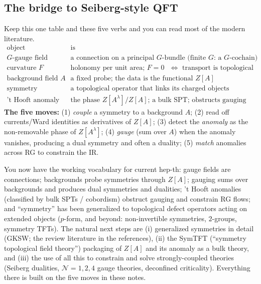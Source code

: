 \documentclass[11pt]{article}
\begin{document}
\subsection{The bridge to Seiberg-style QFT}

\begin{eequation}
Keep this one table and these five verbs and you can read most of the modern literature.
\[
\begin{array}{l|l}
\text{object} & \text{is} \\\hline
\text{$G$-gauge field} & \text{a connection on a principal $G$-bundle (finite $G$: a }G\text{-cochain)}\\
\text{curvature }F & \text{holonomy per unit area; }F=0\text{ }\Leftrightarrow\text{ transport is topological}\\
\text{background field }A & \text{a fixed probe; the data is the functional }Z[A]\\
\text{symmetry} & \text{a topological operator that links its charged objects}\\
\text{'t Hooft anomaly} & \text{the phase }Z[A^\lambda]/Z[A]\text{; a bulk SPT; obstructs gauging}
\end{array}
\]
\textbf{The five moves:} \;(1) \emph{couple} a symmetry to a background $A$;
\;(2) read off currents/Ward identities as derivatives of $Z[A]$;
\;(3) detect the \emph{anomaly} as the non-removable phase of $Z[A^\lambda]$;
\;(4) \emph{gauge} (sum over $A$) when the anomaly vanishes, producing a dual symmetry
and often a duality;
\;(5) \emph{match} anomalies across RG to constrain the IR.
\end{eequation}

\begin{ppreview}
You now have the working vocabulary for current hep-th: gauge fields are connections;
backgrounds probe symmetries through $Z[A]$; gauging sums over backgrounds and produces
dual symmetries and dualities; 't Hooft anomalies (classified by bulk SPTs / cobordism)
obstruct gauging and constrain RG flows; and ``symmetry'' has been generalized to
topological defect operators acting on extended objects ($p$-form, and beyond:
non-invertible symmetries, $2$-groups, symmetry TFTs). The natural next steps are
(i) generalized symmetries in detail (GKSW; the review literature in the references),
(ii) the SymTFT (``symmetry topological field theory'') packaging of $Z[A]$ and its
anomaly as a bulk theory, and (iii) the use of all this to constrain and solve
strongly-coupled theories (Seiberg dualities, $\mathcal N{=}1,2,4$ gauge theories,
deconfined criticality). Everything there is built on the five moves in these notes.
\end{ppreview}
\end{document}
